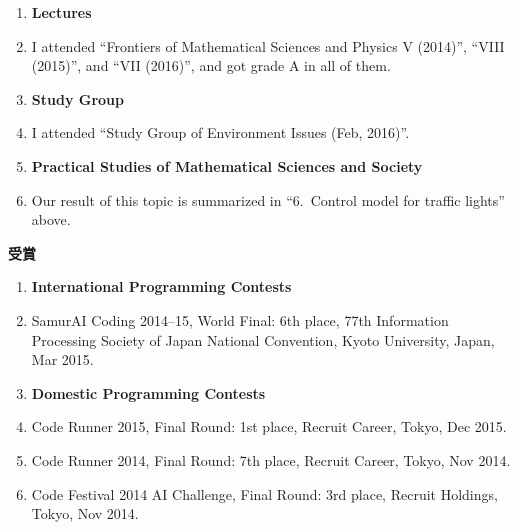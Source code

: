 \begin{enumerate}
 \item[] {\bf Lectures}
 \item I attended ``Frontiers of Mathematical Sciences and Physics V (2014)'',
       ``VIII (2015)'', and ``VII (2016)'', and got grade A in all of
       them.
 \item[] {\bf Study Group}
 \item I attended ``Study Group of Environment Issues (Feb, 2016)''.
 \item[] {\bf Practical Studies of Mathematical Sciences and Society}
 \item Our result of this topic is summarized in
       ``6.~Control model for traffic lights'' above.
\end{enumerate}

\vspace{0.2cm}
\noindent
{\bf 受賞}

\vspace{0.1cm}

\begin{enumerate}
 \item[] {\bf International Programming Contests}
 \item SamurAI Coding 2014--15, World Final: 6th place, 77th Information
       Processing Society of Japan National Convention, Kyoto
       University, Japan, Mar 2015.
 \item[] {\bf Domestic Programming Contests}
 \item Code Runner 2015, Final Round: 1st place,
       Recruit Career, Tokyo, Dec 2015.
 \item Code Runner 2014, Final Round: 7th place,
       Recruit Career, Tokyo, Nov 2014.
 \item Code Festival 2014 AI Challenge, Final Round: 3rd place,
       Recruit Holdings, Tokyo, Nov 2014.
\end{enumerate}

\vspace{0.4cm}

